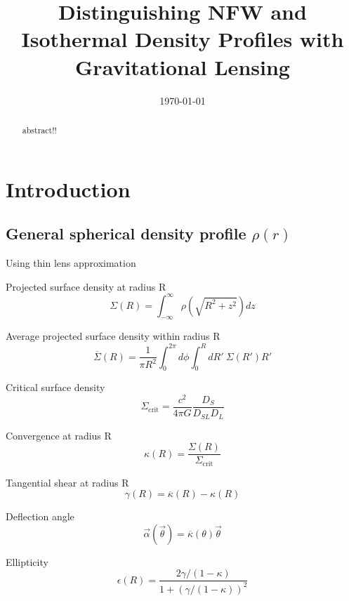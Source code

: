 \documentclass[]{article}
\begin{document}
\title{Distinguishing NFW and Isothermal Density Profiles with Gravitational Lensing}
\author{}
\date{\today}
\maketitle

\begin{abstract}
abstract!!
\end{abstract}

\section{Introduction}

\subsection{General spherical density profile $\rho(r)$}
Using thin lens approximation

Projected surface density at radius R
\begin{equation}
    \Sigma(R) = \int_{-\infty}^{\infty}{\rho(\sqrt{R^2 + z^2}) dz}
\end{equation}

Average projected surface density within radius R
\begin{equation}
    \overline{\Sigma}(R) = \frac{1}{\pi R^2} \int_0^{2\pi}{d\phi \int_0^{R}{dR'~\Sigma(R')R'}}
\end{equation}

Critical surface density
\begin{equation}
    \Sigma_\mathrm{crit} = \frac{c^2}{4\pi G} \frac{D_S}{D_{SL} D_L}
\end{equation}

Convergence at radius R
\begin{equation}
    \kappa(R) = \frac{\Sigma(R)}{\Sigma_\mathrm{crit}}
\end{equation}

Tangential shear at radius R
\begin{equation}
    \gamma(R) = \overline{\kappa}(R) - \kappa(R)
\end{equation}

Deflection angle
\begin{equation}
    \vec{\alpha}(\vec{\theta}) = \overline{\kappa}(\theta)\vec{\theta}
\end{equation}

Ellipticity
\begin{equation}
    \epsilon(R) = \frac{2 \gamma/(1 - \kappa)}{1 + (\gamma/(1 - \kappa))^2}
\end{equation}
\end{document}
